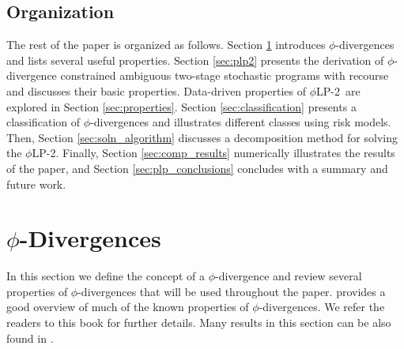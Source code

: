 \documentclass[opre,nonblindrev]{informs3} %
\newcommand{\plp}{$\phi$LP-2}
\begin{document}
\subsection{Organization}

The rest of the paper is organized as follows.
Section \ref{sec:phi_divergences} introduces $\phi$-divergences and lists several useful properties.
Section \ref{sec:plp2} presents the derivation of $\phi$-divergence constrained ambiguous two-stage stochastic programs with recourse and discusses their basic properties. %
Data-driven properties of \plp\ are explored in Section \ref{sec:properties}. 
Section \ref{sec:classification} presents a classification of $\phi$-divergences and illustrates different classes using risk models. 
Then, Section \ref{sec:soln_algorithm} discusses a decomposition method for solving the \plp. Finally, Section \ref{sec:comp_results} numerically illustrates the results of the paper, and 
Section \ref{sec:plp_conclusions} concludes with a summary and future work.

\section{$\phi$-Divergences} %
\label{sec:phi_divergences}

In this section we define the concept of a $\phi$-divergence and review several properties of  $\phi$-divergences that will be used throughout the paper. 
\citet{pardo2005statistical} provides a good overview of much of the known properties of $\phi$-divergences. 
We refer the readers to this book for further details.
Many results in this section can be also found in \cite{bental1991certainty,bental2011robust}.
\end{document}
